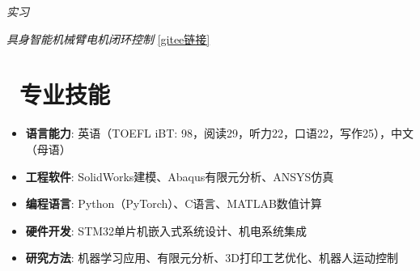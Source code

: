 \documentclass{resume}
\begin{document}
\textit{实习}

\textit{具身智能机械臂电机闭环控制} \href{https://gitee.com/jcXue/foc_-motor}{[gitee链接]}

\section{\faCogs\  专业技能}
\begin{itemize}
  \item \textbf{语言能力}: 英语（TOEFL iBT: 98，阅读29，听力22，口语22，写作25），中文（母语）
  \item \textbf{工程软件}: SolidWorks建模、Abaqus有限元分析、ANSYS仿真
  \item \textbf{编程语言}: Python（PyTorch）、C语言、MATLAB数值计算
  \item \textbf{硬件开发}: STM32单片机嵌入式系统设计、机电系统集成
  \item \textbf{研究方法}: 机器学习应用、有限元分析、3D打印工艺优化、机器人运动控制
\end{itemize}
\end{document}
